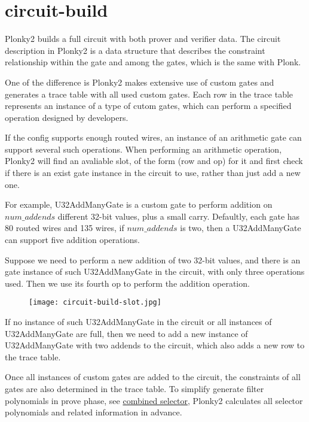 \section{circuit-build}
    \label{circuit-build}

    Plonky2 builds a full circuit with both prover and verifier data. The circuit
    description in Plonky2 is a data structure that describes the constraint
    relationship within the gate and among the gates, which is the same with Plonk.
    
    One of the difference is Plonky2 makes extensive use of custom gates and generates
    a trace table with all used custom gates. Each row in the trace table represents
    an instance of a type of cutom gates, which can perform a specified operation
    designed by developers.

    If the config supports enough routed wires, an instance of an arithmetic gate can
    support several such operations. When performing an arithmetic operation, Plonky2 
    will find an avaliable slot, of the form (row and op) for it and first check if
    there is an exist gate instance in the circuit to use, rather than just add a new
    one.
    
    For example, U32AddManyGate is a custom gate to perform addition on $ num\_addends $ 
    different 32-bit values, plus a small carry. Defaultly, each gate has 80 routed wires
    and 135 wires, if $ num\_addends $ is two, then a U32AddManyGate can support five
    addition operations.
    
    Suppose we need to perform a new addition of two 32-bit values, and there is an gate
    instance of such U32AddManyGate in the circuit, with only three operations used. 
    Then we use its fourth op to perform the addition operation.

    \begin{figure}[!ht]
        \centering
        \texttt{[image: circuit-build-slot.jpg]}
        \label{fig:circuit-build-slot}
    \end{figure}

    If no instance of such U32AddManyGate in the circuit or all instances of U32AddManyGate are
    full, then we need to add a new instance of U32AddManyGate with two addends to the circuit,
    which also adds a new row to the trace table.

    Once all instances of custom gates are added to the circuit, the constraints of all gates
    are also determined in the trace table. To simplify generate filter polynomials in prove
    phase, see \href{https://hackmd.io/@sin7y/H10EO2Z5q#Combined-selector}{combined selector},
    Plonky2 calculates all selector polynomials and related information in advance.

